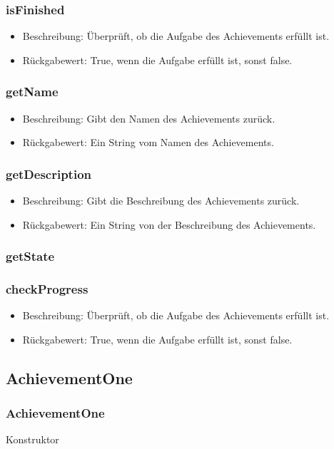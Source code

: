 \documentclass[a4paper]{scrreprt}
\begin{document}
   \subsubsection{isFinished}
   \begin{itemize}
   \item Beschreibung: Überprüft, ob die Aufgabe des Achievements erfüllt ist.
   \item Rückgabewert: True, wenn die Aufgabe erfüllt ist, sonst false.
\end{itemize}
   \subsubsection{getName}
   \begin{itemize}
   \item Beschreibung: Gibt den Namen des Achievements zurück.
   \item Rückgabewert: Ein String vom Namen des Achievements.
\end{itemize}
   \subsubsection{getDescription}
   \begin{itemize}
   \item Beschreibung: Gibt die Beschreibung des Achievements zurück.
   \item Rückgabewert: Ein String von der Beschreibung des Achievements.
\end{itemize}
   \subsubsection{getState}
   \subsubsection{checkProgress}
   \begin{itemize}
   \item Beschreibung: Überprüft, ob die Aufgabe des Achievements erfüllt ist.
   \item Rückgabewert: True, wenn die Aufgabe erfüllt ist, sonst false.
\end{itemize}
   
   \subsection{AchievementOne}
   \subsubsection{AchievementOne}
   Konstruktor
\end{document}
